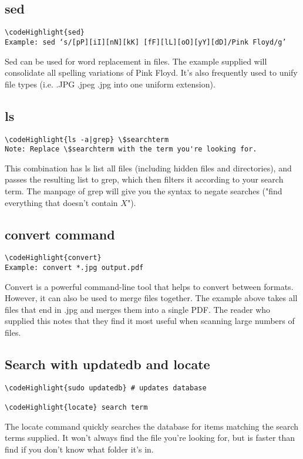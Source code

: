 \documentclass[12pt,a4paper]{article}
\begin{document}
\subsection{sed}  
\begin{Verbatim}[commandchars=\\\{\}]
\codeHighlight{sed}
Example: sed ‘s/[pP][iI][nN][kK] [fF][lL][oO][yY][dD]/Pink Floyd/g’
\end{Verbatim}
Sed can be used for word replacement in files. The example supplied will consolidate all spelling variations of Pink Floyd. It's also frequently used to unify file types (i.e. .JPG .jpeg .jpg into one uniform extension).

\subsection{ls}
\begin{Verbatim}[commandchars=\\\{\}]
\codeHighlight{ls -a|grep} \$searchterm
Note: Replace \$searchterm with the term you're looking for.
\end{Verbatim}
This combination has ls list all files (including hidden files and directories), and passes the resulting list to grep, which then filters it according to your search term.  The manpage of grep will give you the syntax to negate searches ("find everything that doesn't contain $X$").

\subsection{convert command}
\begin{Verbatim}[commandchars=\\\{\}]
\codeHighlight{convert}
Example: convert *.jpg output.pdf
\end{Verbatim}
Convert is a powerful command-line tool that helps to convert between formats. However, it can also be used to merge files together. The example above takes all files that end in .jpg and merges them into a single PDF. The reader who supplied this notes that they find it most useful when scanning large numbers of files.

\subsection{Search with updatedb and locate}
\label{locate}
\begin{Verbatim}[commandchars=\\\{\}]
\codeHighlight{sudo updatedb} # updates database

\codeHighlight{locate} search term
\end{Verbatim}
The locate command quickly searches the database for items matching the search terms supplied. It won't always find the file you're looking for, but is faster than find if you don't know what folder it's in.
\end{document}
